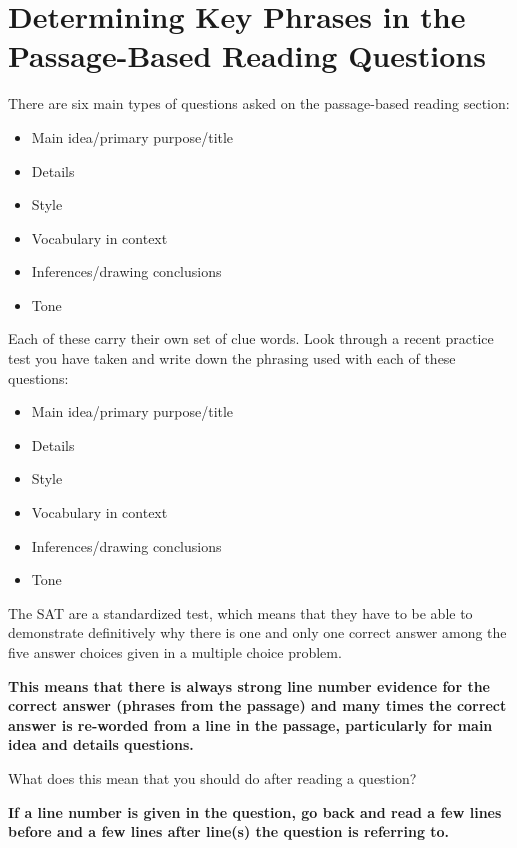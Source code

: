 \section{\sloppy Determining Key Phrases in the Passage-Based Reading Questions}

There are six main types of questions asked on the passage-based reading section:

\begin{itemize}
\item Main idea/primary purpose/title
\item Details
\item Style
\item Vocabulary in context
\item Inferences/drawing conclusions
\item Tone
\end{itemize}

\bigskip
Each of these carry their own set of clue words. Look through a recent practice test you have taken and write down the phrasing used with each of these questions:

\begin{itemize}
\item Main idea/primary purpose/title \hrulefill
\item Details \hrulefill
\item Style \hrulefill
\item Vocabulary in context \hrulefill
\item Inferences/drawing conclusions \hrulefill
\item Tone \hrulefill
\end{itemize}

\bigskip
The SAT are a standardized test, which means that they have to be able to demonstrate definitively why there is one and only one correct answer among the five answer choices given in a multiple choice problem. 

\bigskip
\large{\textbf{This means that there is always strong line number evidence for the correct answer (phrases from the passage) and many times the correct answer is re-worded from a line in the passage, particularly for main idea and details questions.}} 

What does this mean that you should do after reading a question?

\bigskip
\large{\textbf{If a line number is given in the question, go back and read a few lines before and a few lines after line(s) the question is referring to.}}

